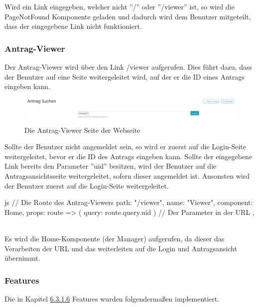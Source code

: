 Wird ein Link eingegeben, welcher nicht ''/'' oder ''/viewer'' ist, so wird die PageNotFound Komponente geladen und dadurch wird dem Benutzer mitgeteilt, dass der eingegebene Link nicht funktioniert.
\subsubsection{Antrag-Viewer}
\label{sec:antrag_viewer}
Der Antrag-Viewer wird über den Link /viewer aufgerufen. Dies führt dazu, dass der Benutzer auf eine Seite weitergeleitet wird, auf der er die ID eines Antrags eingeben kann.
\begin{figure}[H]
	\centering
	\includegraphics[width=1\linewidth]{images/antrag_viewer}
	\caption[Webseite Antrag-Viewer]{Die Antrag-Viewer Seite der Webseite}
	\label{fig:antragviewer}
\end{figure}

Sollte der Benutzer nicht angemeldet sein, so wird er zuerst auf die Login-Seite weitergeleitet, bevor er die ID des Antrags eingeben kann. Sollte der eingegebene Link bereits den Parameter ''uid'' besitzen, wird der Benutzer auf die Antragsansichtsseite weitergeleitet, sofern dieser angemeldet ist. Ansonsten wird der Benutzer zuerst auf die Login-Seite weitergeleitet.
\begin{code}{js}
	{
		// Die Route des Antrag-Viewers
		path: "/viewer",
		name: "Viewer",
		component: Home,
		props: route => ({ query: route.query.uid }) // Der Parameter in der URL
	},
\end{code}
~\\
Es wird die Home-Komponente (der Manager) aufgerufen, da dieser das Verarbeiten der URL und das weiterleiten auf die Login und Antragsansicht übernimmt.
\newpage
\subsubsection{Features}
Die in Kapitel \hyperref[sec:feature]{6.3.1.6} Features wurden folgendermaßen implementiert.

